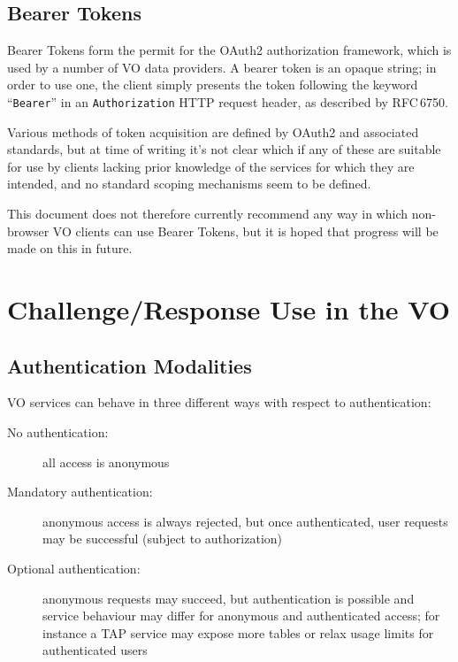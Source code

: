 \documentclass[11pt,a4paper]{ivoa}
\newcommand{\rfc}[1]{RFC\,#1}
\newcommand{\header}[1]{{\tt #1}}
\begin{document}
\subsection{Bearer Tokens}

Bearer Tokens form the permit for
the OAuth2 authorization framework,
which is used by a number of VO data providers.
A bearer token is an opaque string;
in order to use one, the client simply presents the token
following the keyword ``{\tt Bearer}''
in an \header{Authorization} HTTP request header,
as described by \rfc{6750}.

Various methods of token acquisition are defined by OAuth2 and
associated standards, but at time of writing it's not clear which if
any of these are suitable for use by clients lacking prior knowledge
of the services for which they are intended,
and no standard scoping mechanisms seem to be defined.

This document does not therefore currently recommend any way in
which non-browser VO clients can use Bearer Tokens,
but it is hoped that progress will be made on this in future.



\section{Challenge/Response Use in the VO}
\label{sec:cr-use}

\subsection{Authentication Modalities}
\label{sec:modalities}

VO services can behave in three different ways with respect to authentication:
\begin{description}
  \item[No authentication:]
       all access is anonymous
  \item[Mandatory authentication:]
       anonymous access is always rejected, but once authenticated,
       user requests may be successful (subject to authorization)
  \item[Optional authentication:]
       anonymous requests may succeed, but authentication is possible
       and service behaviour may differ for anonymous and authenticated access;
       for instance a TAP service may expose more tables or relax
       usage limits for authenticated users
\end{description}
\end{document}
